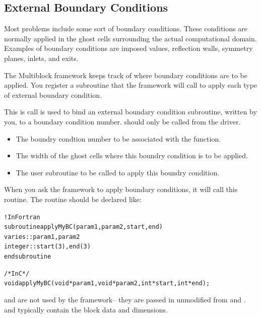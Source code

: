 \documentclass[10pt]{article}
\begin{document}
\vspace{0.2in}

\subsection{External Boundary Conditions}

Most problems include some sort of boundary conditions.  These conditions
are normally applied in the ghost cells surrounding the actual computational domain.
Examples of boundary conditions are imposed values, reflection walls, symmetry planes,
inlets, and exits.

The Multiblock framework keeps track of where boundary conditions are to be applied.
You register a subroutine that the framework will call to apply each type of 
external boundary condition.

\vspace{0.2in}
This is call is used to bind an external boundary condition subroutine,
written by you, to a boundary condition number.
 should only be called from the driver.

\begin{itemize}
	\item {} The boundry condtion number to be associated with the 
	function.
	\item {} The width of the ghost cells where this boundry
	condition is to be applied.
	\item {} The user subroutine to be called to apply this
	boundry condition.
\end{itemize}

When you ask the framework to apply boundary conditions, it will call this
routine.  The routine should be declared like:

\begin{alltt}
	!In Fortran
	subroutine applyMyBC(param1,param2,start,end)
	varies :: param1, param2
	integer :: start(3), end(3)
	end subroutine

	/* In C */
	void applyMyBC(void *param1,void *param2,int *start,int *end);	
\end{alltt}
 
 and  are not used by the framework-- they are
passed in unmodified from  and .
 and  typically contain the block data and dimensions.  
\end{document}
